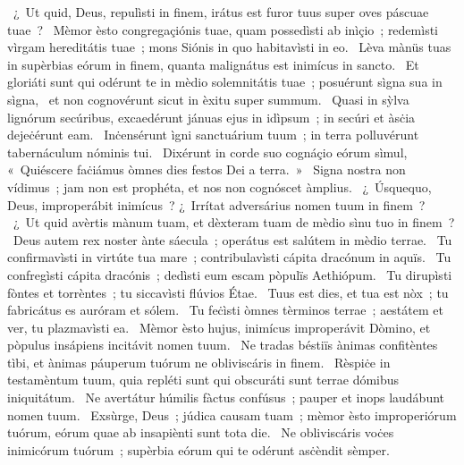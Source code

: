 \psalmChapterWithInscription{}
{ }
{%
~¿~Ut quid, Deus, repulìsti in finem, irátus est furor tuus super oves páscuae tuae~? 
~Mèmor èsto congregaçiónis tuae, quam possedìsti ab inìçio~; redemìsti vìrgam hereditátis tuae~; mons Siónis in quo habitavìsti in eo. 
~Lèva mànüs tuas in supèrbias eórum in finem, quanta malignátus est inimícus in sancto. 
~Et gloriáti sunt qui odérunt te in mèdio solemnitátis tuae~; posuérunt sìgna sua in sìgna, 
~et non cognovérunt sicut in èxitu super summum. 
~Quasi in sỳlva lignórum secúribus, excaedérunt jánuas ejus in idìpsum~; in secúri et àsċia dejeċérunt eam. 
~Inċensérunt ìgni sanctuárium tuum~; in terra polluvérunt tabernáculum nóminis tui. 
~Dixérunt in corde suo cognáçio eórum sìmul, «~Quiéscere faċiámus òmnes dies festos Dei a terra.~»
~Signa nostra non vídimus~; jam non est prophéta, et nos non cognóscet àmplius. 
~¿~Úsquequo, Deus, improperábit inimícus~? ¿~Irrítat adversárius nomen tuum in finem~? 
~¿~Ut quid avèrtis mànum tuam, et dèxteram tuam de mèdio sìnu tuo in finem~? 
~Deus autem rex noster ànte sáecula~; operátus est salútem in mèdio terrae. 
~Tu confirmavìsti in virtúte tua mare~; contribulavìsti cápita dracónum in aquïs. 
~Tu confregìsti cápita dracónis~; dedìsti eum escam pòpulïs Aethiópum. 
~Tu dirupìsti fòntes et torrèntes~; tu siccavìsti flúvios Étae. 
~Tuus est dies, et tua est nòx~; tu fabricátus es auróram et sólem. 
~Tu feċìsti òmnes tèrminos terrae~; aestátem et ver, tu plazmavìsti ea. 
~Mèmor èsto hujus, inimícus improperávit Dòmino, et pòpulus insápiens incitávit nomen tuum. 
~Ne tradas béstiïs ànimas confitèntes tìbi, et ànimas páuperum tuórum ne obliviscáris in finem. 
~Rèspiċe in testamèntum tuum, quia repléti sunt qui obscuráti sunt terrae dómibus iniquitátum. 
~Ne avertátur húmilis fàctus confúsus~; pauper et inops laudábunt nomen tuum. 
~Exsùrge, Deus~; júdica causam tuam~; mèmor èsto improperiórum tuórum, eórum quae ab insapiènti sunt tota die. 
~Ne obliviscáris voċes inimicórum tuórum~; supèrbia eórum qui te odérunt asċèndit sèmper. 
}
